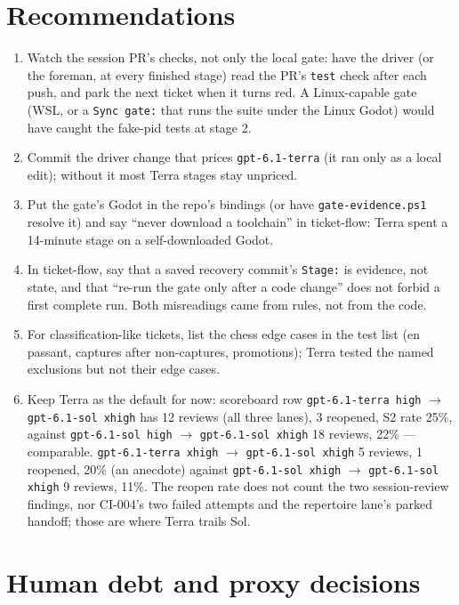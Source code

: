 \documentclass[11pt,a4paper]{article}
\begin{document}
\section*{Recommendations}

\begin{enumerate}
  \item Watch the session PR's checks, not only the local gate: have the driver (or the foreman,
        at every finished stage) read the PR's \texttt{test} check after each push, and park the
        next ticket when it turns red. A Linux-capable gate (WSL, or a \texttt{Sync gate:} that
        runs the suite under the Linux Godot) would have caught the fake-pid tests at stage 2.
  \item Commit the driver change that prices \texttt{gpt-6.1-terra} (it ran only as a local edit);
        without it most Terra stages stay unpriced.
  \item Put the gate's Godot in the repo's bindings (or have \texttt{gate-evidence.ps1} resolve
        it) and say ``never download a toolchain'' in ticket-flow: Terra spent a 14-minute stage
        on a self-downloaded Godot.
  \item In ticket-flow, say that a saved recovery commit's \texttt{Stage:} is evidence, not
        state, and that ``re-run the gate only after a code change'' does not forbid a first
        complete run. Both misreadings came from rules, not from the code.
  \item For classification-like tickets, list the chess edge cases in the test list (en passant,
        captures after non-captures, promotions); Terra tested the named exclusions but not
        their edge cases.
  \item Keep Terra as the default for now: scoreboard row \texttt{gpt-6.1-terra high}
        $\rightarrow$ \texttt{gpt-6.1-sol xhigh} has 12 reviews (all three lanes), 3 reopened,
        S2 rate 25\%, against \texttt{gpt-6.1-sol high} $\rightarrow$ \texttt{gpt-6.1-sol xhigh}
        18 reviews, 22\% --- comparable. \texttt{gpt-6.1-terra xhigh} $\rightarrow$
        \texttt{gpt-6.1-sol xhigh} 5 reviews, 1 reopened, 20\% (an anecdote) against
        \texttt{gpt-6.1-sol xhigh} $\rightarrow$ \texttt{gpt-6.1-sol xhigh} 9 reviews, 11\%. The
        reopen rate does not count the two session-review findings, nor CI-004's two failed
        attempts and the repertoire lane's parked handoff; those are where Terra trails Sol.
\end{enumerate}

\section*{Human debt and proxy decisions}
\end{document}
